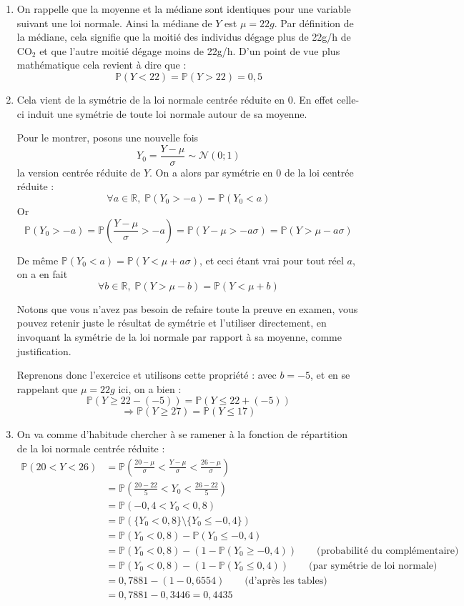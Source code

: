 \documentclass[a4paper,oneside,12pt]{article}
\theoremstyle{plain}
\def\R{{\mathbb R}}
\def\P{{\mathbb P}}
\begin{document}
\begin{enumerate}
    \item On rappelle que la moyenne et la médiane sont identiques pour une variable suivant une loi normale. Ainsi la médiane de $Y$ est $\mu =22g$. Par définition de la médiane, cela signifie que la moitié des individus dégage plus de 22g/h de  $\mbox{CO}_2$ et que l'autre moitié dégage moins de 22g/h. D'un point de vue plus mathématique cela revient à dire que :
    $$\P(Y< 22) = \P(Y> 22) = 0,5$$
    
    \item Cela vient de la symétrie de la loi normale centrée réduite en 0. En effet celle-ci induit une symétrie de toute loi normale autour de sa moyenne.
    
    Pour le montrer, posons une nouvelle fois $$Y_0 = \frac{Y-\mu}{\sigma}\sim\mathcal{N}(0; 1)$$
    la version centrée réduite de $Y$. On a alors par symétrie en 0 de la loi centrée réduite :
    $$\forall a \in \R,\; \P(Y_0>-a) = \P(Y_0<a)$$
    Or $$\P(Y_0>-a) = \P\left(\frac{Y-\mu}{\sigma}>-a\right) = \P\left(Y-\mu>-a\sigma\right) = \P\left(Y>\mu-a\sigma\right) $$
    
    De même $\P(Y_0<a)= \P\left(Y<\mu+a\sigma\right)$, et ceci étant vrai pour tout réel $a$, on a en fait
    $$\forall b \in \R,\; \P(Y>\mu-b) = \P(Y<\mu+b)$$
    
    Notons que vous n'avez pas besoin de refaire toute la preuve en examen, vous pouvez retenir juste le résultat de symétrie et l'utiliser directement, en invoquant la symétrie de la loi normale par rapport à sa moyenne, comme justification.
    
    Reprenons donc l'exercice et utilisons cette propriété : avec $b=-5$, et en se rappelant que $\mu = 22g$ ici, on a bien : $$\P(Y\ge22-(-5)) = \P(Y\le22+ (-5))$$
    $$\Rightarrow \P(Y\ge27) = \P(Y\le17)$$

    
    \item On va comme d'habitude chercher à se ramener à la fonction de répartition de la loi normale centrée réduite :
    \begin{align*}
        \P(20<Y<26) &=\P\left(\frac{20-\mu}{\sigma}<\frac{Y-\mu}{\sigma}<\frac{26-\mu}{\sigma}\right)\\
        &=\P\left(\frac{20-22}{5}<Y_0<\frac{26-22}{5}\right)\\
        &=\P(-0,4<Y_0<0,8)\\
        &=\P(\{Y_0<0,8\} \setminus \{Y_0\le -0,4\})\\
        &= \P(Y_0<0,8) - \P(Y_0\le-0,4)\\
        &=\P(Y_0<0,8) - \left(1-\P(Y_0\ge-0,4)\right) \qquad \mbox{(probabilité du complémentaire)}\\
        &=\P(Y_0<0,8) - \left(1-\P(Y_0\le0,4)\right) \qquad \mbox{(par symétrie de loi normale)}\\
        &= 0,7881 - \left(1 - 0,6554\right) \qquad \mbox{(d'après les tables)}\\
        &= 0,7881 - 0,3446 = 0,4435
    \end{align*}
    

\end{enumerate}
\end{document}
